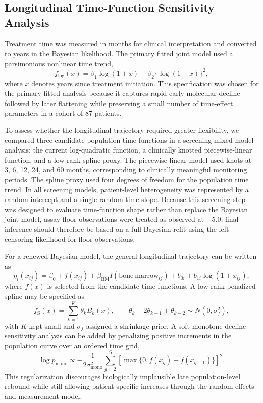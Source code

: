 \subsection{Longitudinal Time-Function Sensitivity Analysis}

Treatment time was measured in months for clinical interpretation and converted to years in the Bayesian likelihood. The primary fitted joint model used a parsimonious nonlinear time trend,
\[
f_{\log}(x)=\beta_1\log(1+x)+\beta_2\{\log(1+x)\}^2,
\]
where \(x\) denotes years since treatment initiation. This specification was chosen for the primary fitted analysis because it captures rapid early molecular decline followed by later flattening while preserving a small number of time-effect parameters in a cohort of 87 patients.

To assess whether the longitudinal trajectory required greater flexibility, we compared three candidate population time functions in a screening mixed-model analysis: the current log-quadratic function, a clinically knotted piecewise-linear function, and a low-rank spline proxy. The piecewise-linear model used knots at 3, 6, 12, 24, and 60 months, corresponding to clinically meaningful monitoring periods. The spline proxy used four degrees of freedom for the population time trend. In all screening models, patient-level heterogeneity was represented by a random intercept and a single random time slope. Because this screening step was designed to evaluate time-function shape rather than replace the Bayesian joint model, assay-floor observations were treated as observed at \(-5.0\); final inference should therefore be based on a full Bayesian refit using the left-censoring likelihood for floor observations.

For a renewed Bayesian model, the general longitudinal trajectory can be written as
\[
\eta_i(x_{ij}) =
\beta_0+f(x_{ij})+\beta_{\mathrm{BM}}I(\mathrm{bone\ marrow}_{ij})
+b_{0i}+b_{1i}\log(1+x_{ij}),
\]
where \(f(x)\) is selected from the candidate time functions. A low-rank penalized spline may be specified as
\[
f_{\mathrm{S}}(x)=\sum_{k=1}^{K}\theta_k B_k(x),
\qquad
\theta_k-2\theta_{k-1}+\theta_{k-2}\sim N(0,\sigma_f^2),
\]
with \(K\) kept small and \(\sigma_f\) assigned a shrinkage prior. A soft monotone-decline sensitivity analysis can be added by penalizing positive increments in the population curve over an ordered time grid,
\[
\log p_{\mathrm{mono}} \propto
-\frac{1}{2\sigma_{\mathrm{mono}}^2}
\sum_{g=2}^{G}\left[\max\{0,f(x_g)-f(x_{g-1})\}\right]^2.
\]
This regularization discourages biologically implausible late population-level rebound while still allowing patient-specific increases through the random effects and measurement model.

